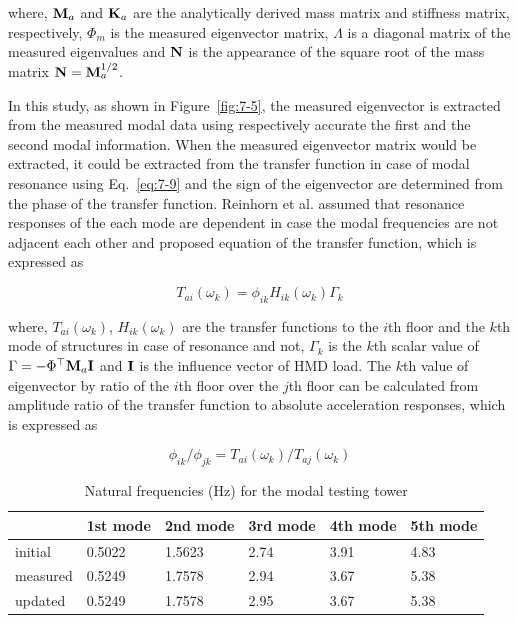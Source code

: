 where, $\mathbf{M}_{a}$ and $\mathbf{K}_{a}$ are the analytically derived mass matrix and stiffness matrix, respectively, $\Phi_{m}$ is the measured eigenvector matrix, $\Lambda$ is a diagonal matrix of the measured eigenvalues and $\mathbf{N}$ is the appearance of the square root of the mass matrix $\mathbf{N} = \mathbf{M}_{a}^{1/2}$.

In this study, as shown in Figure~\ref{fig:7-5}, the measured eigenvector is extracted from the measured modal data using respectively accurate the first and the second modal information. When the measured eigenvector matrix would be extracted, it could be extracted from the transfer function in case of modal resonance using Eq.~\eqref{eq:7-9} and the sign of the eigenvector are determined from the phase of the transfer function. Reinhorn et al. assumed that resonance responses of the each mode are dependent in case the modal frequencies are not adjacent each other and proposed equation of the transfer function, which is expressed as

\begin{equation} \label{eq:7-9}
T_{ai}\left(\omega_{k}\right) = \phi_{ik}H_{ik}\left(\omega_{k}\right)\Gamma_{k}
\end{equation}

where, $T_{ai}\left(\omega_{k}\right)$, $H_{ik}\left(\omega_{k}\right)$ are the transfer functions to the $i$th floor and the $k$th mode of structures in case of resonance and not, $\Gamma_{k}$ is the $k$th scalar value of $\Gamma = -\Phi^{\top}\mathbf{M}_{a}\mathbf{I}$ and $\mathbf{I}$ is the influence vector of HMD load. The $k$th value of eigenvector by ratio of the $i$th floor over the $j$th floor can be calculated from amplitude ratio of the transfer function to absolute acceleration responses, which is expressed as

\begin{equation}\label{eq:7-10}
\phi_{ik}/\phi_{jk} = T_{ai}\left(\omega_{k}\right)/T_{aj}\left(\omega_{k}\right)
\end{equation}

\begin{table}[ht]
\centering
\begin{tabularx}{\textwidth}{@{}X|X|X|X|X|X@{}}
\toprule[1pt]\midrule[0.3pt]
& 1st mode & 2nd mode & 3rd mode & 4th mode & 5th mode\\ \midrule[0.3pt]
initial & 0.5022 & 1.5623 & 2.74 & 3.91 & 4.83\\
measured& 0.5249 & 1.7578 & 2.94 & 3.67 & 5.38\\
updated & 0.5249 & 1.7578 & 2.95 & 3.67 & 5.38\\
\bottomrule
\end{tabularx}
\caption{Natural frequencies (Hz) for the modal testing tower}
\label{tab:7-3}
\end{table}

